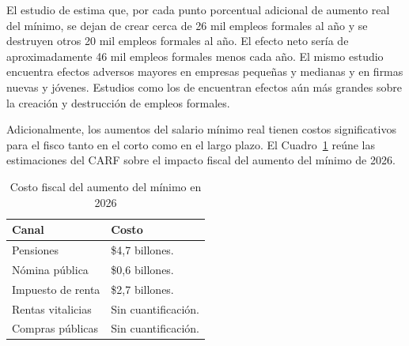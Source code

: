 
El estudio de \citet{florez2022} estima que, por cada punto porcentual adicional de aumento real del mínimo, se dejan de crear cerca de 26 mil empleos formales al año y se destruyen otros 20 mil empleos formales al año. El efecto neto sería de aproximadamente 46 mil empleos formales menos cada año. El mismo estudio encuentra efectos adversos mayores en empresas pequeñas y medianas y en firmas nuevas y jóvenes. Estudios como los de \cite{chaparro} encuentran efectos aún más grandes sobre la creación y destrucción de empleos formales.

Adicionalmente, los aumentos del salario mínimo real tienen costos significativos para el fisco tanto en el corto como en el largo plazo. El Cuadro~\ref{tab:fiscalb} reúne las estimaciones del CARF sobre el impacto fiscal del aumento del mínimo de 2026.

\begin{table}[H]
\centering\small
\caption{Costo fiscal del aumento del mínimo en 2026}
\label{tab:fiscalb}
\renewcommand{\arraystretch}{1.18}
\begin{tabular}{@{}ll@{}}
\toprule
Canal & Costo\\
\midrule
Pensiones & \$4,7 billones.\\[4pt]
Nómina pública & \$0,6 billones.\\[4pt]
Impuesto de renta & \$2,7 billones.\\[4pt]
Rentas vitalicias & Sin cuantificación.\\[4pt]
Compras públicas & Sin cuantificación.\\
\bottomrule
\end{tabular}
\end{table}





